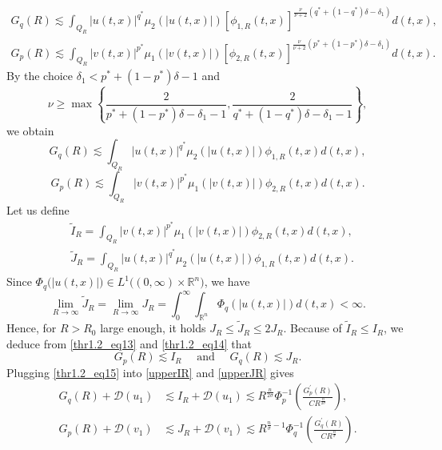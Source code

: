 \documentclass[11pt,reqno]{amsart}
\newcommand{\tron}[1]{\left( #1 \right)}
\numberwithin{equation}{section}
\begin{document}
\[
\begin{aligned}
G_q(R) \lesssim \int_{Q_{R}}|u(t,x)|^{q^*} \mu_2(|u(t,x)|)[\phi_{1,R}(t,x)]^{\frac{\nu}{\nu+2}\tron{q^*+(1-q^*)\delta-\delta_1}} d(t,x), \\
G_p(R) \lesssim \int_{Q_{R}}|v(t,x)|^{p^*} \mu_1(|v(t,x)|)[\phi_{2,R}(t,x)]^{\frac{\nu}{\nu+2}\tron{p^*+(1-p^*)\delta-\delta_1}}d(t,x).
\end{aligned}
\]
By the choice $\delta_1<p^*+(1-p^*)\delta-1$ and 
\[ 
\nu\geq \max\left\{\frac{2}{p^*+(1-p^*)\delta-\delta_1-1},\frac{2}{q^*+(1-q^*)\delta-\delta_1-1}\right\},
\]
we obtain
\begin{equation}\label{thr1.2_eq13}
G_q(R) \lesssim \int_{Q_{R}}|u(t,x)|^{q^*} \mu_2(|u(t,x)|)\phi_{1,R}(t,x)d(t,x),
\end{equation}
\begin{equation}\label{thr1.2_eq14}
G_p(R) \lesssim \int_{Q_{R}}|v(t,x)|^{p^*} \mu_1(|v(t,x)|) \phi_{2,R}(t,x) d(t,x). 
\end{equation}
Let us define 
\begin{equation}
\begin{aligned}
    &\tilde{I}_{R}=\int_{Q_{R}}|v(t,x)|^{p^*} \mu_1(|v(t,x)|) \phi_{2,R}(t,x) d(t,x),\nonumber\\
    &\tilde{J}_{R}=\int_{Q_{R}}|u(t,x)|^{q^*} \mu_2(|u(t,x)|) \phi_{1,R}(t,x) d(t,x).\nonumber
\end{aligned}
\end{equation}
Since $\Phi_q\big(|u(t,x)|)\in L^1((0,\infty)\times \mathbb{R}^n\big)$, we have
\[
\lim_{R\to \infty}\tilde{J}_{R}=\lim_{R\to \infty}J_{R}=\int_{0}^{\infty}\int_{\mathbb{R}^n}\Phi_q(|u(t,x)|)d(t,x)<\infty.
\]
Hence, for $R>R_0$ large enough, it holds $J_{R}\leq \tilde{J}_{R}\leq 2J_{R}$. Because of $\tilde{I}_{R}\leq I_{R}$, we deduce from \eqref{thr1.2_eq13} and \eqref{thr1.2_eq14} that
\begin{equation}\label{thr1.2_eq15}
G_p(R)\lesssim I_{R}\quad \text{ and }\quad G_{q}(R)\lesssim J_{R}.
\end{equation}
\noindent Plugging \eqref{thr1.2_eq15} into \eqref{upperIR} and \eqref{upperJR} gives
\begin{align*}
 G_q(R)+\mathcal{D}(u_1)&\lesssim I_{R}+\mathcal{D}(u_1)\lesssim  R^{\frac{n}{2\sigma}} \Phi_p^{-1}\left(\frac{G_p^{\prime}(R)}{CR^{\frac{n}{2\sigma}}}\right),\\
G_p(R)+\mathcal{D}(v_1)&\lesssim J_{R}+\mathcal{D}(v_1)\lesssim  R^{\frac{n}{\sigma}-1}\Phi_q^{-1}\left(\frac{G_q^{\prime}(R)}{CR^{\frac{n}{\sigma}}}\right).
\end{align*}
\end{document}

